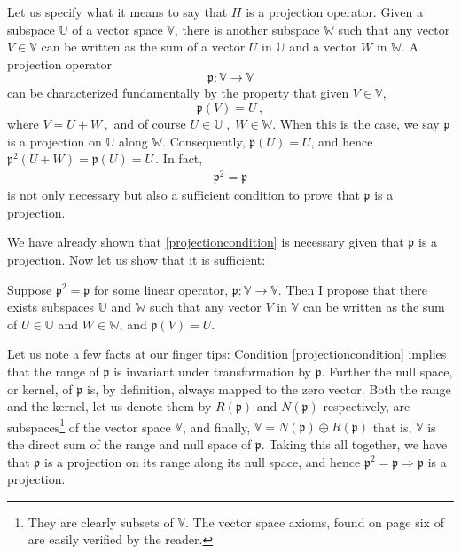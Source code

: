 Let us specify what it means to say that $H$ is a projection operator. Given a subspace $\mathbb{U}$ of a vector space $\mathbb{V}$, there is another subspace $\mathbb{W}$ such that any vector $V \in \mathbb{V}$ can be written as the sum of a vector $U$ in $\mathbb{U}$ and a vector $W$ in $\mathbb{W}$.  A projection operator \[ \mathfrak{p} :  \mathbb{V} \rightarrow \mathbb{V} \] can be characterized fundamentally by the property that given $V \in \mathbb{V}$, 
 \[ \mathfrak{p}(V) = U\,,\] 
 where  $V = U + W\,,$ and of course $U \in \mathbb{U} \;, \; W \in \mathbb{W}$. When this is the case, we say $\mathfrak{p}$ is a projection on $\mathbb{U}$ along $\mathbb{W}$. Consequently, $ \mathfrak{p}(U) = U$, and hence $ \mathfrak{p}^2(U + W) =  \mathfrak{p}(U) = U \,$. In fact,
 \begin{eqnarray} \label{projectioncondition}  \mathfrak{p}^2 =  \mathfrak{p}\end{eqnarray}
 is not only necessary but also a sufficient condition to prove that $ \mathfrak{p}$ is a projection. 
 
 We have already shown that \ref{projectioncondition} is necessary given that $\mathfrak{p}$ is a projection. Now let us show that it is sufficient:
 
 Suppose $\mathfrak{p}^2 =  \mathfrak{p}$ for some linear operator, $\mathfrak{p} : \mathbb{V} \rightarrow \mathbb{V}$. Then I propose that there exists subspaces $\mathbb{U}$ and $\mathbb{W}$ such that any vector $V$ in $\mathbb{V}$ can be written as the sum of $U \in \mathbb{U}$ and $W \in \mathbb{W}$, and $\mathfrak{p}(V) = U$.
 
 Let us note a few facts at our finger tips:  Condition \ref{projectioncondition} implies that the range of $\mathfrak{p}$ is invariant under transformation by $\mathfrak{p}$. Further the null space, or kernel, of $\mathfrak{p}$ is, by definition, always mapped to the zero vector. Both the range and the kernel, let us denote them by $R(\mathfrak{p})$ and $N(\mathfrak{p})$ respectively, are subspaces\footnote{They are clearly subsets of $\mathbb{V}$. The vector space axioms, found on page six of \cite{linear} are easily verified by the reader.} of the vector space $\mathbb{V}$, and finally, $\mathbb{V} = N(\mathfrak{p})  \oplus R(\mathfrak{p})$ that is, $\mathbb{V}$ is the direct sum of the range and null space of $\mathfrak{p}$. Taking this all together, we have that $\mathfrak{p}$ is a projection on its range along its null space, and hence $\mathfrak{p}^2 = \mathfrak{p} \Rightarrow \mathfrak{p}$ is a projection.
 
